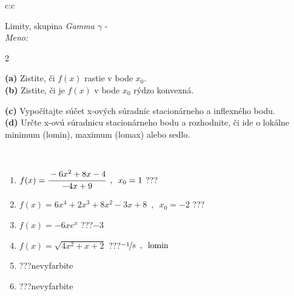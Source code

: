 \documentclass[10pt]{report}
\begin{document}
\begin{tabular}{c:c}
\begin{minipage}[c][104.5mm][t]{0.5\linewidth}
\begin{center}
\vspace{7mm}
{\huge Limity, skupina \textit{Gamma $\gamma$} -}\\[5mm]
\textit{Meno:}\phantom{xxxxxxxxxxxxxxxxxxxxxxxxxxxxxxxxxxxxxxxxxxxxxxxxxxxxxxxxxxxxxxxxx}\\[5mm]
\begin{minipage}{0.95\linewidth}
\begin{center}
{\small \begin{multicols}{2} \raggedright
\textbf{(a)} Zistite, či \(f(x)\) rastie v bode \(x_0\). \\[1mm]
\textbf{(b)} Zistite, či je \(f(x)\) v bode \(x_0\) rýdzo konvexná. \par \columnbreak
\textbf{(c)} Vypočítajte súčet x-ových súradníc stacionárneho a inflexného bodu. \\[1mm]
\textbf{(d)} Určte x-ovú súradnicu stacionárneho bodu a rozhodnite, či ide o lokálne minimum (lomin), maximum (lomax) alebo sedlo. \\[1mm]
\end{multicols}
}
\end{center}
\end{minipage}
\\[4mm]
\begin{minipage}{0.79\linewidth}
\begin{center}
\begin{varwidth}{\linewidth}
\begin{enumerate}
\normalsize
\item $f(x)=\cfrac{-6x^2+8x-4}{-4x+9}\enspace , \enspace x_0=1$\quad \dotfill\; ???\;\dotfill \quad {}
\item $f(x)=6x^4+2x^3+8x^2-3x+8\enspace , \enspace x_0=-2$\quad \dotfill\; ???\;\dotfill \quad {}
\item $f(x)=-6xe^{x}$\quad \dotfill\; ???\;\dotfill \quad $-3$
\item $f(x)=\sqrt{4x^2+x+2}$\quad \dotfill\; ???\;\dotfill \quad $\nicefrac{-1}{8}\enspace , \enspace\text{lomin}$
\item \quad \dotfill\; ???\;\dotfill \quad nevyfarbite
\item \quad \dotfill\; ???\;\dotfill \quad nevyfarbite
\end{enumerate}
\end{varwidth}
\end{center}

\end{minipage}
\end{center}
\end{minipage}
\end{tabular}
\end{document}
